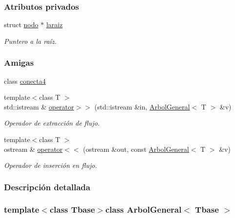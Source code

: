 \subsubsection*{Atributos privados}
\begin{DoxyCompactItemize}
\item 
struct \hyperlink{structArbolGeneral_1_1nodo}{nodo} $\ast$ \hyperlink{classArbolGeneral_a14a859dc79b8df4d5a77b5c871713c9e}{laraiz}
\begin{DoxyCompactList}\small\item\em Puntero a la raíz. \end{DoxyCompactList}\end{DoxyCompactItemize}
\subsubsection*{Amigas}
\begin{DoxyCompactItemize}
\item 
class \hyperlink{classArbolGeneral_afa4822ac18b5b10d0eb75d2c3f69f0d8}{conecta4}
\item 
{\footnotesize template$<$class T $>$ }\\std\-::istream \& \hyperlink{classArbolGeneral_ab1318141f030856da7dcfc1c7a162565}{operator$>$$>$} (std\-::istream \&in, \hyperlink{classArbolGeneral}{Arbol\-General}$<$ T $>$ \&v)
\begin{DoxyCompactList}\small\item\em Operador de extracción de flujo. \end{DoxyCompactList}\item 
{\footnotesize template$<$class T $>$ }\\ostream \& \hyperlink{classArbolGeneral_a2b19e120d650b0363eed1bfd8c7f5351}{operator$<$$<$} (ostream \&out, const \hyperlink{classArbolGeneral}{Arbol\-General}$<$ T $>$ \&v)
\begin{DoxyCompactList}\small\item\em Operador de inserción en flujo. \end{DoxyCompactList}\end{DoxyCompactItemize}


\subsubsection{Descripción detallada}
\subsubsection*{template$<$class Tbase$>$class Arbol\-General$<$ Tbase $>$}

